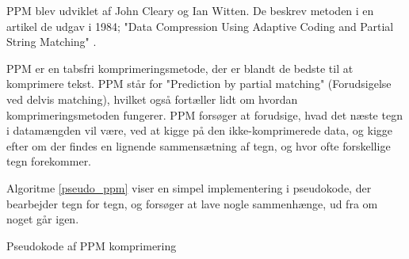 PPM blev udviklet af John Cleary og Ian Witten. De beskrev metoden i en artikel de udgav i 1984; "Data Compression Using Adaptive Coding and Partial String Matching" \cite{Cleary84datacompression}.

PPM er en tabsfri komprimeringsmetode, der er blandt de bedste til at komprimere tekst. PPM står for "Prediction by partial matching" (Forudsigelse ved delvis matching), hvilket også fortæller lidt om hvordan komprimeringsmetoden fungerer. PPM forsøger at forudsige, hvad det næste tegn i datamængden vil være, ved at kigge på den ikke-komprimerede data, og kigge efter om der findes en lignende sammensætning af tegn, og hvor ofte forskellige tegn forekommer. 

Algoritme \ref{pseudo_ppm} viser en simpel implementering i pseudokode, der bearbejder tegn for tegn, og forsøger at lave nogle sammenhænge, ud fra om noget går igen.

\begin{algorithm}[H]
 \SetAlgoLined
\caption{Pseudokode af PPM komprimering \cite{ppm_stringology}}
\label{pseudo_ppm}
\end{algorithm}
